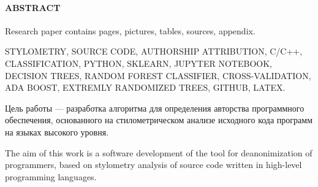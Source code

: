 \newpage
{}
\paragraph{\hfill ABSTRACT \hfill}
Research paper contains  pages,  pictures,  tables,
 sources,  appendix.

STYLOMETRY, SOURCE CODE, AUTHORSHIP ATTRIBUTION, C/C++, CLASSIFICATION, PYTHON, SKLEARN,
JUPYTER NOTEBOOK, DECISION TREES, RANDOM FOREST CLASSIFIER, CROSS-VALIDATION, 
ADA BOOST, EXTREMLY RANDOMIZED TREES, GITHUB, LATEX.

Цель работы --- разработка алгоритма для определения авторства программного обеспечения, 
основанного на стилометрическом анализе исходного кода программ на языках высокого уровня.

The aim of this work is a software development of the tool for deanonimization of programmers, 
based on stylometry analysis of source code written in high-level programming languages.  